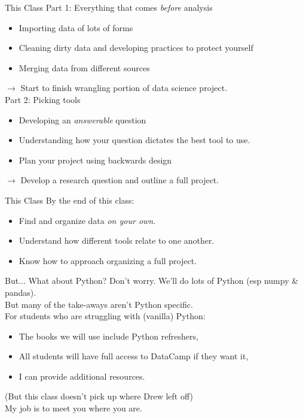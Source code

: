 \documentclass[11pt]{beamer}
\begin{document}
\begin{frame}[c]{This Class}
Part 1: Everything that comes \emph{before} analysis
\begin{itemize}
	\pause \item Importing data of lots of forms
	\pause \item Cleaning dirty data and developing practices to protect yourself
	\pause \item Merging data from different sources
\end{itemize}
\pause $\rightarrow$ Start to finish wrangling portion of data science project.\\
\vspace*{0.2cm}
\pause Part 2: Picking tools
\begin{itemize}
	\pause \item Developing an \emph{answerable} question
	\pause \item Understanding how your question dictates the best tool to use.
	\pause \item Plan your project using backwards design
\end{itemize}
\pause $\rightarrow$ Develop a research question and outline a full project.
\end{frame}

\begin{frame}[c]{This Class}
By the end of this class:
\begin{itemize}
	\pause \item Find and organize data \emph{on your own}.
	\pause \item Understand how different tools relate to one another.
	\pause \item Know how to approach organizing a full project.
\end{itemize}
\end{frame}

\begin{frame}[c]{But... What about Python?}
\pause
Don't worry. We'll do lots of Python (esp numpy \& pandas). \\
\pause But many of the take-aways aren't Python specific.\\
\vspace*{0.5cm}
\pause For students who are struggling with (vanilla) Python:
\begin{itemize}
	\item The books we will use include Python refreshers,
	\item All students will have full access to DataCamp if they want it,
	\item I can provide additional resources.
\end{itemize}
\pause (But this class doesn't pick up where Drew left off) \\
\vspace*{0.2cm}
\pause \alert{My job is to meet you where you are.}
\end{frame}
\end{document}
